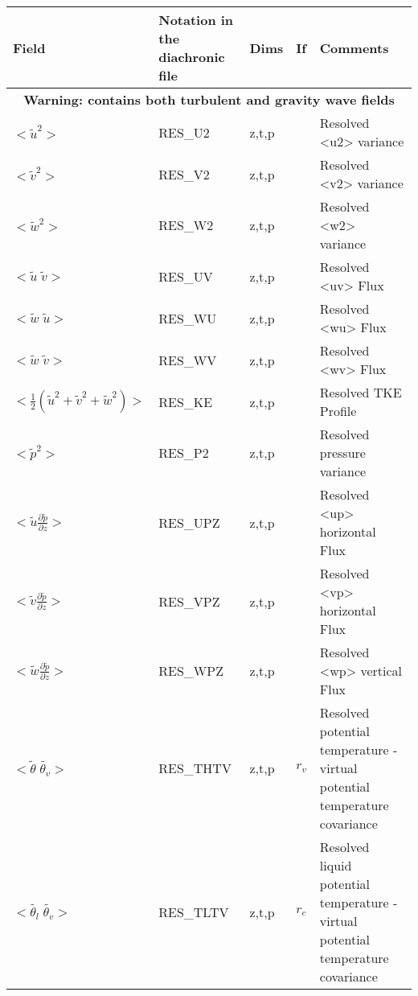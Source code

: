 \begingroup
\renewcommand\arraystretch{1.5}
\begin{longtable}[c]{|p{}|p{}|p{}|p{}|p{}|}
\hline
Field & Notation in the diachronic file & Dims & If  & Comments \\
\hline \hline
\endhead
\multicolumn{5}{|c|}{\textbf{Warning: contains both turbulent and gravity wave fields}} \\
\hline
\endfoot
$<\tilde{u}^2>$                                      & RES\_U2    & z,t,p   &       & Resolved <u2> variance \\\hline
$<\tilde{v}^2>$                                      & RES\_V2    & z,t,p   &       & Resolved <v2> variance \\\hline
$<\tilde{w}^2>$                                      & RES\_W2    & z,t,p   &       & Resolved <w2> variance \\\hline
$<\tilde{u}\;\tilde{v}>$                             & RES\_UV    & z,t,p   &       & Resolved <uv> Flux \\\hline
$<\tilde{w}\;\tilde{u}>$                             & RES\_WU    & z,t,p   &       & Resolved <wu> Flux \\\hline
$<\tilde{w}\;\tilde{v}>$                             & RES\_WV    & z,t,p   &       & Resolved <wv> Flux \\\hline
$<\frac{1}{2}(\tilde{u}^2+\tilde{v}^2+\tilde{w}^2)>$ & RES\_KE    & z,t,p   &       & Resolved TKE Profile\\\hline
$<\tilde{p}^2>$                                      & RES\_P2    & z,t,p   &       & Resolved pressure variance \\\hline
$<\tilde{u}\frac{\partial\tilde{p}}{\partial z}>$    & RES\_UPZ   & z,t,p   &       & Resolved <up> horizontal Flux \\\hline
$<\tilde{v}\frac{\partial\tilde{p}}{\partial z}>$    & RES\_VPZ   & z,t,p   &       & Resolved <vp> horizontal Flux\\\hline
$<\tilde{w}\frac{\partial\tilde{p}}{\partial z}>$    & RES\_WPZ   & z,t,p   &       & Resolved <wp> vertical Flux \\\hline
$<\tilde{\theta}\;\tilde{\theta_v}>$                 & RES\_THTV  & z,t,p   & $r_v$ & Resolved potential temperature - virtual potential temperature covariance \\\hline
$<\tilde{\theta_l}\;\tilde{\theta_v}>$               & RES\_TLTV  & z,t,p   & $r_c$ & Resolved liquid potential temperature - virtual potential temperature covariance \\\hline

\end{longtable}

